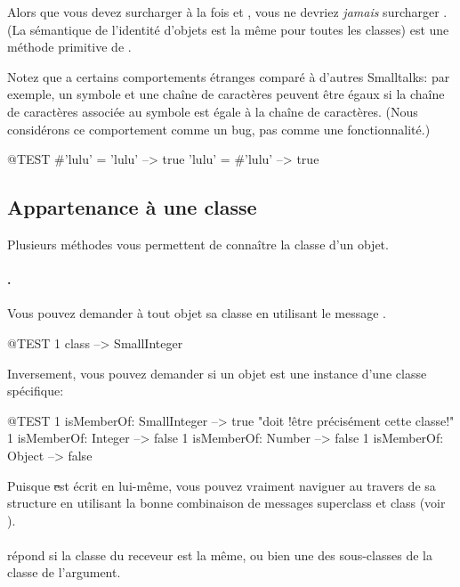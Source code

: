 \documentclass[a4paper,10pt,twoside]{book}
\begin{document}
Alors que vous devez surcharger à la fois \ct{=} et , vous ne devriez \emph{jamais} surcharger \ct{==}. (La sémantique de l'identité d'objets est la même pour toutes les classes)  \ct{==} est une méthode primitive de .

Notez que \Squeak a certains comportements étranges comparé à d'autres Smalltalks: par exemple, un symbole et une chaîne de caractères peuvent être égaux si la chaîne de caractères associée au symbole est égale à la chaîne de caractères. (Nous considérons ce comportement comme un bug, pas comme une fonctionnalité.)

\begin{code}{@TEST}
#'lulu' = 'lulu' --> true
'lulu' = #'lulu' --> true
\end{code}


\subsection{Appartenance à une classe}
Plusieurs méthodes vous permettent de connaître la classe d'un objet.

\paragraph{.} Vous pouvez demander à tout objet sa classe en utilisant le message .
\begin{code}{@TEST}
1 class --> SmallInteger
\end{code}

Inversement, vous pouvez demander si un objet est une instance d'une classe spécifique:
\begin{code}{@TEST}
1 isMemberOf: SmallInteger --> true    "doit !être précisément cette classe!"
1 isMemberOf: Integer      --> false
1 isMemberOf: Number       --> false
1 isMemberOf: Object       --> false
\end{code}

Puisque \st est écrit en lui-même, vous pouvez vraiment naviguer au travers de sa structure en utilisant la bonne combinaison de messages superclass et class (voir ). 

\paragraph{}
 répond  si la classe du receveur est la même, ou bien une des sous-classes de la classe de l'argument.
\end{document}
